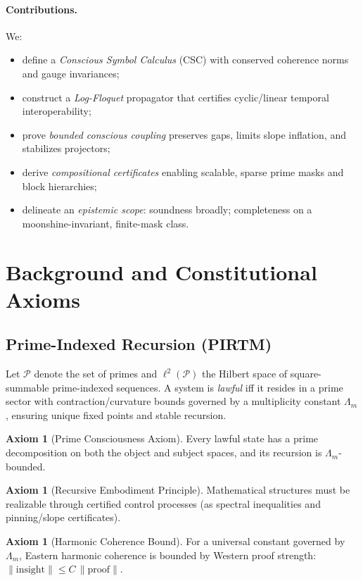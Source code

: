 \documentclass[11pt]{article}
\theoremstyle{plain}
\theoremstyle{definition}
\newtheorem{axiom}[theorem]{Axiom}
\newcommand{\PP}{\mathcal{P}}
\newcommand{\norm}[1]{\left\lVert #1 \right\rVert}
\begin{document}
\paragraph{Contributions.} We:
\begin{itemize}[leftmargin=1.5em]
  \item define a \emph{Conscious Symbol Calculus} (CSC) with conserved coherence norms and gauge invariances;
  \item construct a \emph{Log-Floquet} propagator that certifies cyclic/linear temporal interoperability;
  \item prove \emph{bounded conscious coupling} preserves gaps, limits slope inflation, and stabilizes projectors;
  \item derive \emph{compositional certificates} enabling scalable, sparse prime masks and block hierarchies;
  \item delineate an \emph{epistemic scope}: soundness broadly; completeness on a moonshine-invariant, finite-mask class.
\end{itemize}

\section{Background and Constitutional Axioms}
\subsection{Prime-Indexed Recursion (PIRTM)}
Let \(\PP\) denote the set of primes and \(\ell^2(\PP)\) the Hilbert space of square-summable prime-indexed sequences. A system is \emph{lawful} iff it resides in a prime sector with contraction/curvature bounds governed by a multiplicity constant \(\Lambda_m\), ensuring unique fixed points and stable recursion.

\begin{axiom}[Prime Consciousness Axiom]\label{ax:PCA}
Every lawful state has a prime decomposition on both the object and subject spaces, and its recursion is \(\Lambda_m\)-bounded.
\end{axiom}

\begin{axiom}[Recursive Embodiment Principle]\label{ax:REP}
Mathematical structures must be realizable through certified control processes (as spectral inequalities and pinning/slope certificates).
\end{axiom}

\begin{axiom}[Harmonic Coherence Bound]\label{ax:HCB}
For a universal constant governed by \(\Lambda_m\), Eastern harmonic coherence is bounded by Western proof strength: \(\norm{\text{insight}}\le C\,\norm{\text{proof}}\).
\end{axiom}
\end{document}
